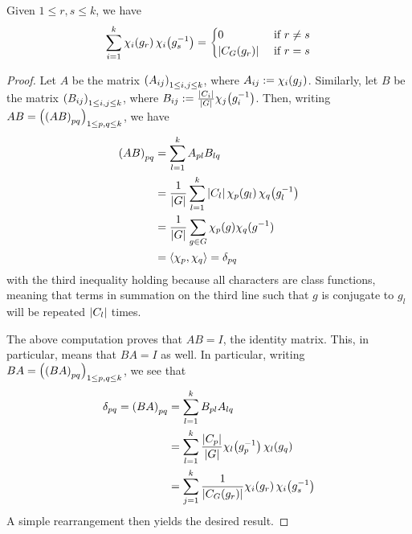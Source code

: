 \begin{boxproposition}\label{SP:2nd_Orth_Rel}
    Given $1 \leq r, s \leq k$, we have
    \begin{align*}
        \sum_{i=1}^{k} \chi_{i}\!\left( g_r \right) \chi_{i}\!\left( g_s^{-1} \right) =
        \begin{cases}
            0 &\text{ if } r \neq s \\
            \left\lvert C_G(g_r) \right\rvert &\text{ if } r = s
        \end{cases}
    \end{align*}
\end{boxproposition}
\begin{proof}
    Let $A$ be the matrix $\left( A_{ij} \right)_{1 \leq i, j \leq k}$, where $A_{ij} := \chi_{i}\!\left( g_j \right)$. Similarly, let $B$ be the matrix $\left( B_{ij} \right)_{1 \leq i, j \leq k}$, where $B_{ij} := \frac{\left\lvert C_i \right\rvert}{\left\lvert G \right\rvert} \chi_{j}\!\left( g_i^{-1} \right)$. Then, writing $AB = \left( \left( AB \right)_{pq} \right)_{1 \leq p, q \leq k}$, we have
    \begin{align*}
        \left( AB \right)_{pq} &=
        \sum_{l=1}^{k} A_{pl} B_{lq} \\
        &= \frac{1}{\left\lvert G \right\rvert} \sum_{l=1}^{k} \left\lvert C_l \right\rvert \chi_{p}\!\left( g_l \right) \chi_{q}\!\left( g_l^{-1} \right) \\
        &= \frac{1}{\left\lvert G \right\rvert} \sum_{g \in G} \chi_p(g) \chi_q(g^{-1}) \\
        &= \left\langle \chi_p, \chi_q \right\rangle = \delta_{pq}
    \end{align*}
    with the third inequality holding because all characters are class functions, meaning that terms in summation on the third line such that $g$ is conjugate to $g_l$ will be repeated $\left\lvert C_l \right\rvert$ times.
    
    The above computation proves that $AB = I$, the identity matrix. This, in particular, means that $BA = I$ as well. In particular, writing $BA = \left( \left( BA \right)_{pq} \right)_{1 \leq p, q \leq k}$, we see that
    \begin{align}
        \delta_{pq} = \left( BA \right)_{pq} &= \sum_{l=1}^{k} B_{pl} A_{lq} \nonumber \\
        &= \sum_{l=1}^{k} \frac{\left\lvert C_p \right\rvert}{\left\lvert G \right\rvert} \chi_{l}\!\left( g_p^{-1} \right) \chi_{l}\!\left( g_q \right) \nonumber \\
        &= \sum_{j=1}^{k} \frac{1}{\left\lvert C_G(g_r) \right\rvert} \chi_{i}\!\left( g_r \right) \chi_{i}\!\left( g_s^{-1} \right)
        \label{SP:Eq:2nd_Orth_Rel_Conj_Cl}
    \end{align}
    A simple rearrangement then yields the desired result.
\end{proof}
